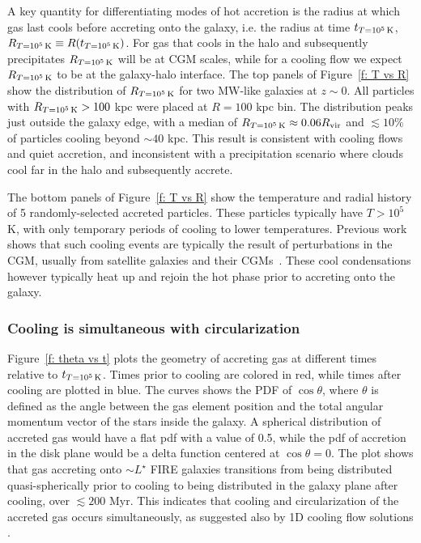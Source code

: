 \documentclass[fleqn,usenatbib]{mnras}
\newcommand{\Rcon}{R_{T=10^5\,{\rm K}}}
\newcommand{\tcon}{t_{T=10^5\,{\rm K}}}
\begin{document}
A key quantity for differentiating modes of hot accretion is the radius at which gas last cools before accreting onto the galaxy, i.e. the radius at time $\tcon$, $\Rcon \equiv R (\tcon)$.
For gas that cools in the halo and subsequently precipitates $\Rcon$ will be at CGM scales, while for a cooling flow we expect $\Rcon$ to be at the galaxy-halo interface.
The top panels of Figure~\ref{f: T vs R} show the distribution of $\Rcon$ for two MW-like galaxies at $z\sim0$.
All particles with $\Rcon>100$ kpc were placed at $R=100$ kpc bin. 
The distribution peaks just outside the galaxy edge, with a median of $\Rcon \approx 0.06 R_{\rm vir}$ and $\lesssim 10\%$ of particles cooling beyond $\sim 40$ kpc.
This result is consistent with cooling flows and quiet accretion, and inconsistent with a precipitation scenario where clouds cool far in the halo and subsequently accrete.

The bottom panels of Figure~\ref{f: T vs R} show the temperature and radial history of 5 randomly-selected accreted particles.
These particles typically have $T>10^5$ K, with only temporary periods of cooling to lower temperatures.
Previous work shows that such cooling events are typically the result of perturbations in the CGM, usually from satellite galaxies and their CGMs~\citep{Esmerian2020}.
These cool condensations however typically heat up and rejoin the hot phase prior to accreting onto the galaxy. 

\subsubsection{Cooling is simultaneous with circularization}
\label{s: characteristics -- aligns}

Figure~\ref{f: theta vs t} plots the geometry of accreting gas at different times relative to $\tcon$.
Times prior to cooling are colored in red, while times after cooling are plotted in blue.
The curves shows the PDF of $\cos \theta$, where $\theta$ is defined as the angle between the gas element position and the total angular momentum vector of the stars inside the galaxy.
A spherical distribution of accreted gas would have a flat pdf with a value of 0.5, while 
the pdf of accretion in the disk plane would be a delta function centered at $\cos\theta = 0$.
The plot shows that gas accreting onto $\sim L^\star$ FIRE galaxies transitions from being distributed quasi-spherically prior to cooling to being distributed in the galaxy plane after cooling, over $\lesssim 200$ Myr.
This indicates that cooling and circularization of the accreted gas occurs simultaneously, as suggested also by 1D cooling flow solutions \citep{Stern2020}. 
\end{document}
